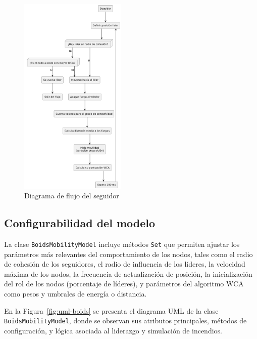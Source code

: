 \documentclass{article}
\begin{document}
\begin{figure}[H]
    \centering
    \includegraphics[width=0.45\textwidth]{DiagramaSeguidor.png}
    \caption{Diagrama de flujo del seguidor}
    \label{fig:diagFoll}
\end{figure}


\subsection{Configurabilidad del modelo}

La clase \texttt{BoidsMobilityModel} incluye métodos \texttt{Set} que permiten ajustar los parámetros más relevantes del comportamiento de los nodos, tales como el radio de cohesión de los seguidores, el radio de influencia de los líderes, la velocidad máxima de los nodos, la frecuencia de actualización de posición, la inicialización del rol de los nodos (porcentaje de líderes), y parámetros del algoritmo WCA como pesos y umbrales de energía o distancia. 

En la Figura~\ref{fig:uml-boids} se presenta el diagrama UML de la clase \texttt{BoidsMobilityModel}, donde se observan sus atributos principales, métodos de configuración, y lógica asociada al liderazgo y simulación de incendios.
\end{document}
